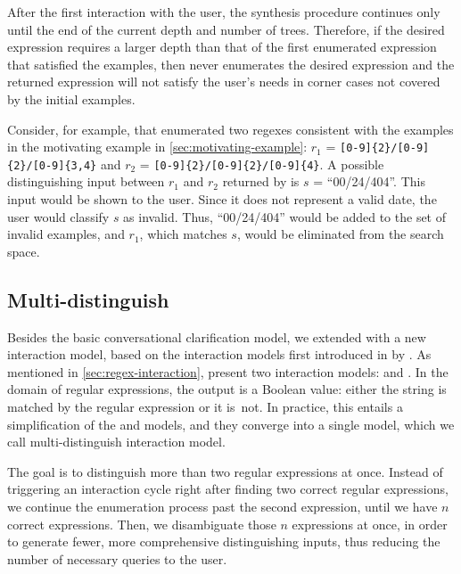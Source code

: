 After the first interaction with the user, the synthesis procedure continues only until the end of the current depth and number of trees. Therefore, if the desired expression requires a larger depth than that of the first enumerated expression that satisfied the examples, then \Forest{} never enumerates the desired expression and the returned expression will not satisfy the user's needs in corner cases not covered by the initial examples.

\begin{example}
Consider, for example, that \Forest{} enumerated two regexes consistent with the examples in the motivating example in \autoref{sec:motivating-example}:
\(r_1\) = \Verb![0-9]{2}/[0-9]{2}/[0-9]{3,4}!
and
\(r_2\) = 
\Verb![0-9]{2}/[0-9]{2}/[0-9]{4}!. 
A possible distinguishing input between \(r_1\) and \(r_2\) returned by \Forest{} is \(s\) = ``00/24/404''. This input would be shown to the user. Since it does not represent a valid date, the user would classify \(s\) as invalid. Thus, ``00/24/404'' would be added to the set of invalid examples, and \(r_1\), which matches \(s\), would be eliminated from the search space.
\end{example}



\subsection{Multi-distinguish}\label{sec:multi-dist}

Besides the basic conversational clarification model, we extended \Forest{} with a new interaction model, based on the interaction models first introduced in \citeyear{UnchartIt20} by \citet{UnchartIt20}. 
As mentioned in \autoref{sec:regex-interaction}, \citeauthor{UnchartIt20} present two interaction models: \ynmodel and \optmodel.
In the domain of regular expressions, the output is a Boolean value: either the string is matched by the regular expression or it is~not. In practice, this entails a simplification of the \ynmodel and \optmodel models, and they converge into a single model, which we call multi-distinguish interaction model.

The goal is to distinguish more than two regular expressions at once. Instead of triggering an interaction cycle right after finding two correct regular expressions, we continue the enumeration process past the second expression, until we have \(n\) correct expressions. Then, we disambiguate those \(n\) expressions at once, in order to generate fewer, more comprehensive distinguishing inputs, thus reducing the number of necessary queries to the user.

